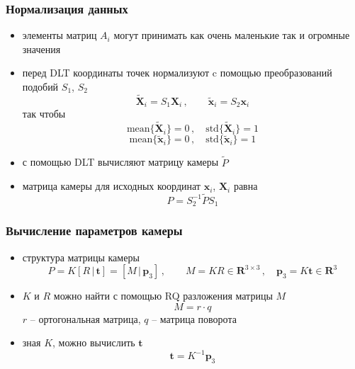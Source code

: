 \documentclass[12pt,usepdftitle=false,aspectratio=1610]{beamer}
\begin{document}
\begin{frame}
\frametitle{Нормализация данных}
\begin{itemize}
    \item элементы матриц $A_i$ могут принимать как очень маленькие так и огромные значения
    \item перед DLT координаты точек нормализуют c помощью преобразований подобий $S_1$, $S_2$
    $$
        \widetilde{\mathbf{X}}_i=S_1\mathbf{X}_i\,,\qquad
        \widetilde{\mathbf{x}}_i=S_2\mathbf{x}_i
    $$
    так чтобы
    $$
        \mathrm{mean}\{\widetilde{\mathbf{X}}_i\}=0\,,\quad 
        \mathrm{std}\{\widetilde{\mathbf{X}}_i\}=1
    $$
    $$
        \mathrm{mean}\{\widetilde{\mathbf{x}}_i\}=0\,,\quad 
        \mathrm{std}\{\widetilde{\mathbf{x}}_i\}=1
    $$
    \item с помощью DLT вычисляют матрицу камеры $\widetilde{P}$
    \item матрица камеры для исходных координат $\mathbf{x}_i$, $\mathbf{X}_i$ равна 
    $$
        P=S_2^{-1}\widetilde{P}S_1
    $$ 
\end{itemize}
\end{frame}

\begin{frame}
\frametitle{Вычисление параметров камеры}
\begin{itemize}
    \item структура матрицы камеры
    $$
        P = K[R\,|\,\mathbf{t}] = [M\,|\,\mathbf{p}_3]\,, \qquad
        M = KR\in\mathbf{R}^{3\times3}\,,\quad
        \mathbf{p}_3=K\mathbf{t}\in\mathbf{R}^3
    $$
    \item $K$ и $R$ можно найти с помощью RQ разложения матрицы $M$
    $$
        M = r\cdot q
    $$
    $r$ -- ортогональная матрица, $q$ -- матрица поворота
    \item зная $K$, можно вычислить $\mathbf{t}$
    $$
        \mathbf{t}=K^{-1}\mathbf{p}_3
    $$
\end{itemize}
\end{frame}
\end{document}

